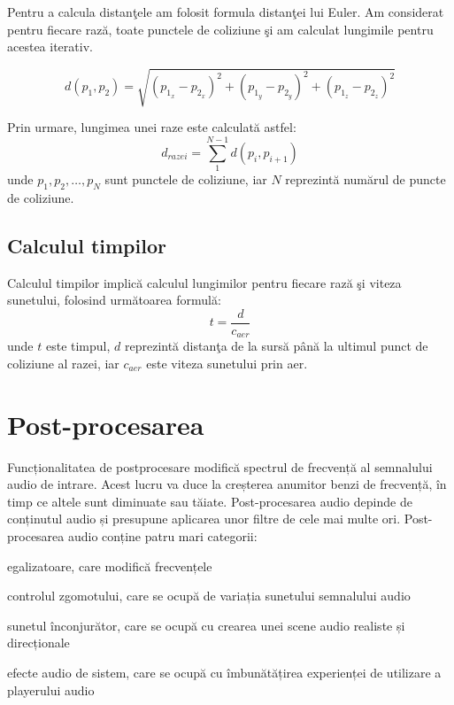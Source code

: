 	Pentru a calcula distan\c{t}ele am folosit formula distan\c{t}ei lui Euler. Am considerat pentru fiecare raz\u{a}, toate punctele de coliziune \c{s}i am calculat lungimile pentru acestea iterativ.
	 
	
	\begin{equation}
		d(p_1, p_2) = \sqrt{(p_{1_x} - p_{2_x})^2 + (p_{1_y} - p_{2_y})^2 + (p_{1_z} - p_{2_z})^2}
	\end{equation}
	 
	
	Prin urmare, lungimea unei raze este calculat\u{a} astfel:
	\begin{equation}
		d_{razei} = \sum_{1}^{N-1}{d(p_i, p_{i+1})}
	\end{equation}
	unde $p_1, p_2, \dots, p_{N}$ sunt punctele de coliziune, iar $N$ reprezint\u{a} num\u{a}rul de puncte de coliziune.

\subsection{Calculul timpilor}

	Calculul timpilor implic\u{a} calculul lungimilor pentru fiecare raz\u{a} \c{s}i viteza sunetului, folosind urm\u{a}toarea formul\u{a}:
	\begin{equation}
		t = \frac{d}{c_{aer}}
	\end{equation}
	unde $t$ este timpul, $d$ reprezint\u{a} distan\c{t}a de la surs\u{a} p\^{a}n\u{a} la ultimul punct de coliziune al razei, iar $c_{aer}$ este viteza sunetului prin aer.

\section{Post-procesarea}

	Funcționalitatea de postprocesare modifică spectrul de frecvență al semnalului audio de intrare. Acest lucru va duce la creșterea anumitor benzi de frecvență, în timp ce altele sunt diminuate sau tăiate. Post-procesarea audio depinde de conținutul audio și presupune aplicarea unor filtre de cele mai multe ori. Post-procesarea audio conține patru mari categorii:
	
	\begin{itemize}
		\utb egalizatoare, care modifică frecvențele
		
		\utb controlul zgomotului, care se ocupă de variația sunetului semnalului audio
		
		\utb sunetul înconjurător, care se ocupă cu crearea unei scene audio realiste și direcționale
		
		\utb efecte audio de sistem, care se ocupă cu îmbunătățirea experienței de utilizare a playerului audio
	\end{itemize}

